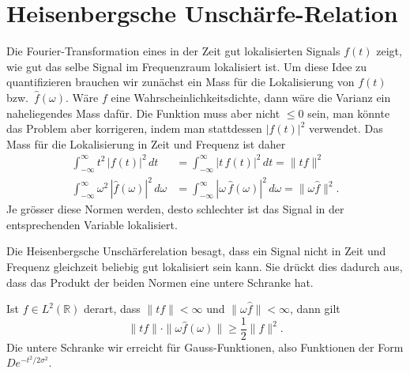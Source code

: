 %
%
%
\section{Heisenbergsche Unschärfe-Relation
\label{section:heisenberg}}
Die Fourier-Transformation eines in der Zeit gut lokalisierten
Signals $f(t)$ zeigt, wie gut das selbe Signal im Frequenzraum
lokalisiert ist.
Um diese Idee zu quantifizieren brauchen wir zunächst ein Mass für
die Lokalisierung von $f(t)$ bzw.~$\hat{f}(\omega)$.
Wäre $f$ eine Wahrscheinlichkeitsdichte, dann wäre die Varianz ein
naheliegendes Mass dafür.
Die Funktion muss aber nicht $\le 0$ sein, man könnte das Problem
aber korrigeren, indem man stattdessen $|f(t)|^2$ verwendet.
Das Mass für die Lokalisierung in Zeit und Frequenz ist daher
\begin{align*}
\int_{-\infty}^\infty
t^2 \, |f(t)|^2\,dt
&=
\int_{-\infty}^\infty
|t\,f(t)|^2\,dt
=
\|tf\|^2
\\
\int_{-\infty}^\infty
\omega^2\,|\hat{f}(\omega)|^2\,d\omega
&=
\int_{-\infty}^\infty
|\omega\,\hat{f}(\omega)|^2\,d\omega
=
\|\omega \hat{f}\|^2.
\end{align*}
Je grösser diese Normen werden, desto schlechter ist das Signal in der
entsprechenden Variable lokalisiert.

Die Heisenbergsche Unschärferelation besagt, dass ein Signal nicht
in Zeit und Frequenz gleichzeit beliebig gut lokalisiert sein kann.
Sie drückt dies dadurch aus, dass das Produkt der beiden Normen 
eine untere Schranke hat.

\begin{satz}[Heisenberg]
Ist $f\in L^2(\mathbb R)$ derart, dass 
$\|tf\|<\infty$ und $\|\omega\hat{f}\|<\infty$, dann gilt
\begin{equation}
\| tf \| \cdot \| \omega \hat{f}(\omega)\| \ge \frac12\| f\|^2.
\label{heisenberg:gleichung}
\end{equation}
Die untere Schranke wir erreicht für Gauss-Funktionen, also Funktionen
der Form $De^{-t^2/2\sigma^2}$.
\end{satz}

